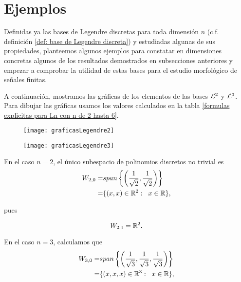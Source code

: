 \section{Ejemplos}
\label{sec: ejemplos}
Definidas ya las bases de Legendre discretas
para toda dimensión $n$ 
(c.f. definición  
\ref{def: base de Legendre discreta}) y estudiadas algunas de sus 
propiedades, planteemos algunos ejemplos
para constatar en dimensiones concretas algunos de los
resultados demostrados en subsecciones anteriores
y empezar a comprobar la utilidad de estas bases para el 
estudio morfológico de señales finitas.


\begin{ejemplo}
A continuación, mostramos las gráficas de los
elementos de las bases $\mathcal{L}^{2}$ y $\mathcal{L}^{3}$.
Para dibujar las gráficas usamos los valores
calculados en la tabla
\ref{formulas explicitas para Ln con n de 2 hasta 6}.

\begin{figure}[H]
	\centering
	\texttt{[image: graficasLegendre2]} 
\end{figure}	


\begin{figure}[H]
	\centering
	\texttt{[image: graficasLegendre3]} 
\end{figure}	




En el caso $n=2$, el único subespacio de polinomios
discretos no trivial es 
\begin{align*}
W_{2,0}= & span \left\{ 
\left(\frac{1}{\sqrt2}, \frac{1}{\sqrt2} \right) \right\} \\
= & \{ (x,x) \in \mathbb{R}^{2}: \hspace{0.2cm} x \in \mathbb{R} \},
\end{align*}

pues

\begin{equation}
\label{eq1: 1Dic}
W_{2,1}= \mathbb{R}^{2}.
\end{equation}


En el caso $n=3$, calculamos que
\begin{align*}
W_{3,0}= & span \left\{
\left( \frac{1}{\sqrt3}, \frac{1}{\sqrt3},
\frac{1}{\sqrt3} \right) \right\}  \\
= & \{ (x,x,x) \in \mathbb{R}^{3}: \hspace{0.2cm} x \in \mathbb{R} \},
\end{align*}


\end{ejemplo}
